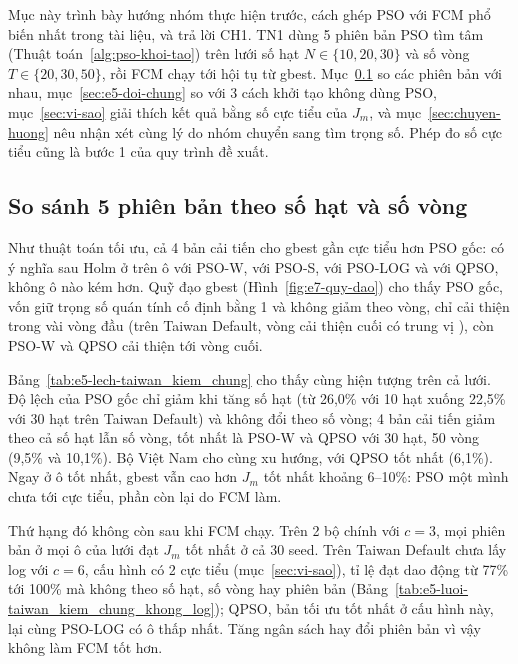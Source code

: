 Mục này trình bày hướng nhóm thực hiện trước, cách ghép PSO với FCM phổ biến nhất trong tài liệu, và trả lời CH1. TN1 dùng
5 phiên bản PSO tìm tâm (Thuật toán~\ref{alg:pso-khoi-tao}) trên lưới số hạt $N \in \{10, 20, 30\}$ và số vòng
$T \in \{20, 30, 50\}$, rồi FCM chạy tới hội tụ từ gbest. Mục~\ref{sec:e5-dat-j} so các phiên bản với nhau,
mục~\ref{sec:e5-doi-chung} so với 3 cách khởi tạo không dùng PSO, mục~\ref{sec:vi-sao} giải thích kết quả bằng số cực tiểu
của $J_m$, và mục~\ref{sec:chuyen-huong} nêu nhận xét cùng lý do nhóm chuyển sang tìm trọng số. Phép đo số cực tiểu cũng là
bước 1 của quy trình đề xuất.

\subsection{So sánh 5 phiên bản theo số hạt và số vòng}
\label{sec:e5-dat-j}

Như thuật toán tối ưu, cả 4 bản cải tiến cho gbest gần cực tiểu hơn PSO gốc: có ý nghĩa sau Holm ở
\soLieuENamKdWTotHon{} trên \soLieuENamKdSoOMoiPb{} ô với PSO-W, \soLieuENamKdSTotHon{} với PSO-S, \soLieuENamKdLogTotHon{} với
PSO-LOG và \soLieuENamKdQpsoTotHon{} với QPSO, không ô nào kém hơn. Quỹ đạo gbest (Hình~\ref{fig:e7-quy-dao}) cho thấy PSO gốc,
vốn giữ trọng số quán tính cố định bằng 1 và không giảm theo vòng, chỉ cải thiện trong vài vòng đầu (trên Taiwan Default, vòng cải thiện cuối có trung vị
\soLieuEBayTaiwanKiemChungGocHatBaKhongVongNamKhongVongCuoiTv), còn PSO-W và QPSO cải thiện tới vòng cuối.
\label{sec:e5-toi-uu}

Bảng~\ref{tab:e5-lech-taiwan_kiem_chung} cho thấy cùng hiện tượng trên cả lưới. Độ lệch của PSO gốc chỉ giảm khi tăng số hạt
(từ 26,0\% với 10 hạt xuống 22,5\% với 30 hạt trên Taiwan Default) và không đổi theo số vòng; 4 bản cải tiến giảm theo cả
số hạt lẫn số vòng, tốt nhất là PSO-W và QPSO với 30 hạt, 50 vòng (9,5\% và 10,1\%). Bộ Việt Nam cho cùng xu hướng, với QPSO tốt nhất (6,1\%). Ngay ở ô
tốt nhất, gbest vẫn cao hơn $J_m$ tốt nhất khoảng 6--10\%: PSO một mình chưa tới cực tiểu, phần còn lại do FCM làm.



Thứ hạng đó không còn sau khi FCM chạy. Trên 2 bộ chính với $c = 3$, mọi phiên bản ở mọi ô của lưới đạt $J_m$ tốt nhất ở
cả 30 seed. Trên Taiwan Default chưa lấy log với $c = 6$, cấu hình có 2 cực tiểu (mục~\ref{sec:vi-sao}), tỉ lệ đạt dao động
từ 77\% tới 100\% mà không theo số hạt, số vòng hay phiên bản (Bảng~\ref{tab:e5-luoi-taiwan_kiem_chung_khong_log}); QPSO, bản
tối ưu tốt nhất ở cấu hình này, lại cùng PSO-LOG có ô thấp nhất. Tăng ngân sách hay đổi phiên bản vì vậy không làm FCM tốt hơn.

